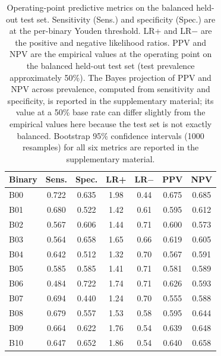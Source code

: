 \documentclass[utf8]{FrontiersinHarvard} %
\begin{document}
\begin{table}[t]
\centering
\caption{Operating-point predictive metrics on the balanced held-out test set. Sensitivity (Sens.) and specificity (Spec.) are at the per-binary Youden threshold. LR+ and LR$-$ are the positive and negative likelihood ratios. PPV and NPV are the empirical values at the operating point on the balanced held-out test set (test prevalence approximately 50\%). The Bayes projection of PPV and NPV across prevalence, computed from sensitivity and specificity, is reported in the supplementary material; its value at a 50\% base rate can differ slightly from the empirical values here because the test set is not exactly balanced. Bootstrap 95\% confidence intervals (1000 resamples) for all six metrics are reported in the supplementary material.}
\label{tab:threshold_metrics}
\footnotesize
\setlength{\tabcolsep}{6pt}
\renewcommand{\arraystretch}{1.15}
\begin{tabular}{@{}l c c c c c c@{}}
\toprule
\textbf{Binary} & \textbf{Sens.} & \textbf{Spec.} & \textbf{LR+} & \textbf{LR$-$} & \textbf{PPV} & \textbf{NPV} \\
\midrule
B00 & 0.722 & 0.635 & 1.98 & 0.44 & 0.675 & 0.685 \\
B01 & 0.680 & 0.522 & 1.42 & 0.61 & 0.595 & 0.612 \\
B02 & 0.567 & 0.606 & 1.44 & 0.71 & 0.600 & 0.573 \\
B03 & 0.564 & 0.658 & 1.65 & 0.66 & 0.619 & 0.605 \\
B04 & 0.642 & 0.512 & 1.32 & 0.70 & 0.567 & 0.591 \\
B05 & 0.585 & 0.585 & 1.41 & 0.71 & 0.581 & 0.589 \\
B06 & 0.484 & 0.722 & 1.74 & 0.71 & 0.626 & 0.593 \\
B07 & 0.694 & 0.440 & 1.24 & 0.70 & 0.555 & 0.588 \\
B08 & 0.679 & 0.557 & 1.53 & 0.58 & 0.595 & 0.644 \\
B09 & 0.664 & 0.622 & 1.76 & 0.54 & 0.639 & 0.648 \\
B10 & 0.647 & 0.652 & 1.86 & 0.54 & 0.640 & 0.658 \\
\bottomrule
\end{tabular}
\end{table}
\end{document}
